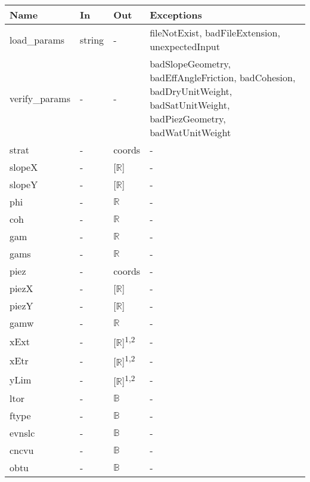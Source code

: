 \documentclass[12pt, titlepage]{article}
\begin{document}
\begin{center}
\renewcommand*{\arraystretch}{1.5}
\begin{tabular}{p{}  p{}  p{}  
p{} } \hline 

  \textbf{Name} & \textbf{In} & \textbf{Out} & \textbf{Exceptions} \\ \hline

   load\_params & string & - & 
   fileNotExist, badFileExtension, unexpectedInput  \\
   
   verify\_params & - & - & 
   badSlopeGeometry, badEffAngleFriction, badCohesion, badDryUnitWeight, 
   badSatUnitWeight, badPiezGeometry, badWatUnitWeight \\
   
   strat & - & coords & - \\
   slopeX & - & [$\mathbb{R}$] & - \\
   slopeY & - & [$\mathbb{R}$] & - \\
   phi & - & $\mathbb{R}$ & - \\
   coh & - & $\mathbb{R}$ & - \\
   gam & - & $\mathbb{R}$ & - \\
   gams & - & $\mathbb{R}$ & - \\
   piez & - & coords & - \\
   piezX & - & [$\mathbb{R}$] & - \\
   piezY & - & [$\mathbb{R}$] & - \\
   gamw & - & $\mathbb{R}$ & - \\
   xExt & - & [$\mathbb{R}$]\textsuperscript{1,2} & - \\
   xEtr & - & [$\mathbb{R}$]\textsuperscript{1,2} & - \\
   yLim & - & [$\mathbb{R}$]\textsuperscript{1,2} & - \\
   ltor & - & $\mathbb{B}$ & - \\
   ftype & - & $\mathbb{B}$ & - \\
   evnslc & - & $\mathbb{B}$ & - \\
   cncvu & - & $\mathbb{B}$ & - \\
   obtu & - & $\mathbb{B}$ & - \\
   \hline

\end{tabular}
\end{center}

\end{document}
